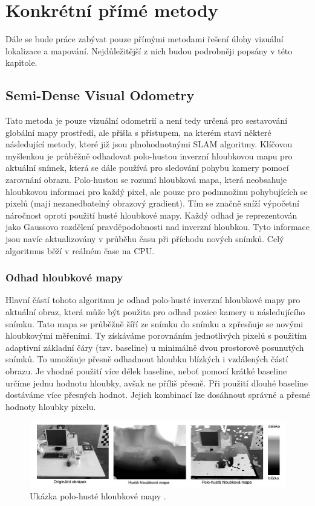 \documentclass[12pt,a4paper]{report}
\begin{document}
\chapter{Konkrétní přímé metody}
Dále se bude práce zabývat pouze přímými metodami řešení úlohy vizuální lokalizace a mapování. Nejdůležitější z nich budou podrobněji popsány v této kapitole.

\section{Semi-Dense Visual Odometry}
Tato metoda je pouze vizuální odometrií a není tedy určená pro sestavování globální mapy prostředí, ale přišla s přístupem, na kterém staví některé následující metody, které již jsou plnohodnotnými SLAM algoritmy. Klíčovou myšlenkou je průběžně odhadovat polo-hustou inverzní hloubkovou mapu pro aktuální snímek, která se dále používá pro sledování pohybu kamery pomocí zarovnání obrazu. Polo-hustou se rozumí hloubková mapa, která neobsahuje hloubkovou informaci pro každý pixel, ale pouze pro podmnožinu pohybujících se pixelů (mají nezanedbatelný obrazový gradient). Tím se značně sníží výpočetní náročnost oproti použití husté hloubkové mapy. Každý odhad je reprezentován jako Gaussovo rozdělení pravděpodobnosti nad inverzní hloubkou. Tyto informace jsou navíc aktualizovány v průběhu času při příchodu nových snímků. Celý algoritmus běží v reálném čase na CPU.

\subsection*{Odhad hloubkové mapy}
Hlavní částí tohoto algoritmu je odhad polo-husté inverzní hloubkové mapy pro aktuální obraz, která může být použita pro odhad pozice kamery u následujícího snímku. Tato mapa se průběžně šíří ze snímku do snímku a zpřesňuje se novými hloubkovými měřeními. Ty získáváme porovnáním jednotlivých pixelů s použitím adaptivní základní čáry (tzv. baseline) u minimálně dvou prostorově posunutých snímků. To umožňuje přesně odhadnout hloubku blízkých i vzdálených částí obrazu. Je vhodné použití více délek baseline, neboť pomocí krátké baseline určíme jednu hodnotu hloubky, avšak ne příliš přesně. Při použití dlouhé baseline dostáváme více přesných hodnot. Jejich kombinací lze dosáhnout správné a přesné hodnoty hloubky pixelu.

\begin{figure}[H]
\centering
\includegraphics[scale=0.7]{img/hloubkova_mapa.jpg}
\caption{Ukázka polo-husté hloubkové mapy \cite{Semi-Dense_VO}.}
\end{figure}
\end{document}
